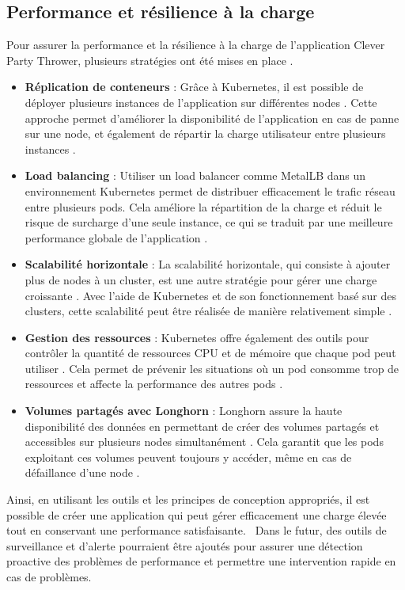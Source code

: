 \subsection{Performance et résilience à la charge}\label{subsec:performance-et-resilience}

Pour assurer la performance et la résilience à la charge de l'application Clever Party Thrower, plusieurs stratégies ont été mises en place .

\begin{itemize}
    \item \textbf{Réplication de conteneurs} : Grâce à Kubernetes, il est possible de déployer plusieurs instances de l'application sur différentes nodes .
    Cette approche permet d'améliorer la disponibilité de l'application en cas de panne sur une node, et également de répartir la charge utilisateur entre plusieurs instances .

    \item \textbf{Load balancing} : Utiliser un load balancer comme MetalLB dans un environnement Kubernetes permet de distribuer efficacement le trafic réseau entre plusieurs pods.
    Cela améliore la répartition de la charge et réduit le risque de surcharge d'une seule instance, ce qui se traduit par une meilleure performance globale de l'application .

    \item \textbf{Scalabilité horizontale} : La scalabilité horizontale, qui consiste à ajouter plus de nodes à un cluster, est une autre stratégie pour gérer une charge croissante .
    Avec l'aide de Kubernetes et de son fonctionnement basé sur des clusters, cette scalabilité peut être réalisée de manière relativement simple .

    \item \textbf{Gestion des ressources} : Kubernetes offre également des outils pour contrôler la quantité de ressources CPU et de mémoire que chaque pod peut utiliser .
    Cela permet de prévenir les situations où un pod consomme trop de ressources et affecte la performance des autres pods .

    \item \textbf{Volumes partagés avec Longhorn} : Longhorn assure la haute disponibilité des données en permettant de créer des volumes partagés et accessibles sur plusieurs nodes simultanément .
    Cela garantit que les pods exploitant ces volumes peuvent toujours y accéder, même en cas de défaillance d'une node .
\end{itemize}

Ainsi, en utilisant les outils et les principes de conception appropriés, il est possible de créer une application qui peut gérer efficacement une charge élevée tout en conservant une performance satisfaisante. \
Dans le futur, des outils de surveillance et d'alerte pourraient être ajoutés pour assurer une détection proactive des problèmes de performance et permettre une intervention rapide en cas de problèmes.